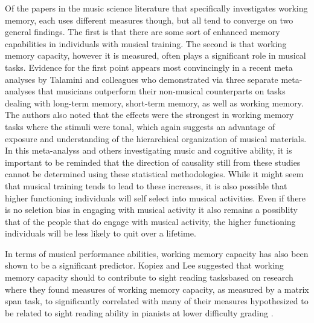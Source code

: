 \documentclass[]{book}
\theoremstyle{definition}
\theoremstyle{definition}
\theoremstyle{definition}
\theoremstyle{remark}
\begin{document}
Of the papers in the music science literature that specifically
investigates working memory, each uses different measures though, but
all tend to converge on two general findings. The first is that there
are some sort of enhanced memory capabilities in individuals with
musical training. The second is that working memory capacity, however it
is measured, often plays a significant role in musical tasks. Evidence
for the first point appears most convincingly in a recent meta analyses
by Talamini and colleagues \citep{talaminiMusiciansHaveBetter2017} who
demonstrated via three separate meta-analyses that musicians outperform
their non-musical counterparts on tasks dealing with long-term memory,
short-term memory, as well as working memory. The authors also noted
that the effects were the strongest in working memory tasks where the
stimuli were tonal, which again suggests an advantage of exposure and
understanding of the hierarchical organization of musical materials. In
this meta-analyss and others investigating music and cognitive ability,
it is important to be reminded that the direction of causality still
from these studies cannot be determined using these statistical
methodologies. While it might seem that musical training tends to lead
to these increases, it is also possible that higher functioning
individuals will self select into musical activities. Even if there is
no seletion bias in engaging with musical activity it also remains a
possiblity that of the people that do engage with musical activity, the
higher functioning individuals will be less likely to quit over a
lifetime.

In terms of musical performance abilities, working memory capacity has
also been shown to be a significant predictor. Kopiez and Lee suggested
that working memory capacity should to contribute to sight reading
tasksbased on research where they found measures of working memory
capacity, as measured by a matrix span task, to significantly correlated
with many of their measures hypothesized to be related to sight reading
ability in pianists at lower difficulty grading
\citep{kopiezDynamicModelSkills2006, kopiezGeneralModelSkills2008}.
\end{document}
